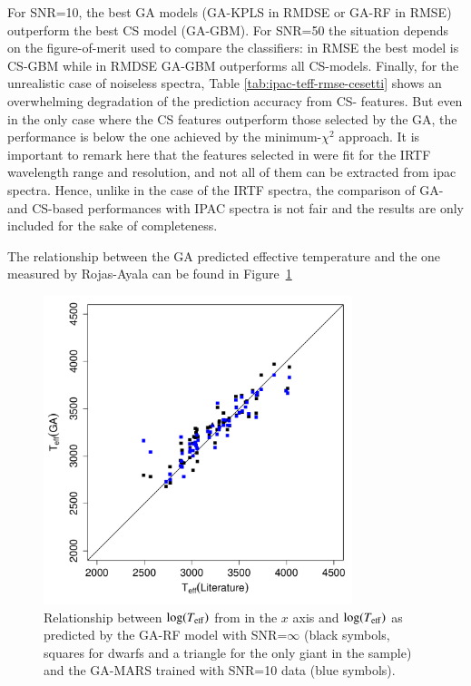 For SNR=10, the best GA models (GA-KPLS in RMDSE or GA-RF in RMSE)
outperform the best CS model (GA-GBM). For SNR=50 the situation
depends on the figure-of-merit used to compare the classifiers: in
RMSE the best model is CS-GBM while in RMDSE GA-GBM outperforms all
CS-models. Finally, for the unrealistic case of noiseless spectra,
Table \ref{tab:ipac-teff-rmse-cesetti} shows an overwhelming
degradation of the prediction accuracy from CS- features. But even in
the only case where the CS features outperform those selected by the
GA, the performance is below the one achieved by the minimum-$\chi^2$
approach. It is important to remark here that the features selected
in \cite{cesetti} were fit for the IRTF wavelength range and
resolution, and not all of them can be extracted from ipac
spectra. Hence, unlike in the case of the IRTF spectra, the comparison
of GA- and CS-based performances with IPAC spectra is not fair and
the results are only included for the sake of completeness.

The relationship between the GA predicted effective temperature and
the one measured by Rojas-Ayala can be found in
Figure~\ref{fig:ipac_lt_lt}

\begin{figure}
 \begin{center} \includegraphics[width=9cm]{figs/ipac_LG_Trojas_Tknn_10.pdf} \caption{Relationship
 between $\log(T_{\rm eff})$ from \cite{RA2012} in the $x$ axis and
 $\log(T_{\rm eff})$ as predicted by the GA-RF model with SNR=$\infty$
 (black symbols, squares for dwarfs and a triangle for the only giant
 in the sample) and the GA-MARS trained with SNR=10 data (blue
 symbols).} \label{fig:ipac_lt_lt} \end{center}
\end{figure}

